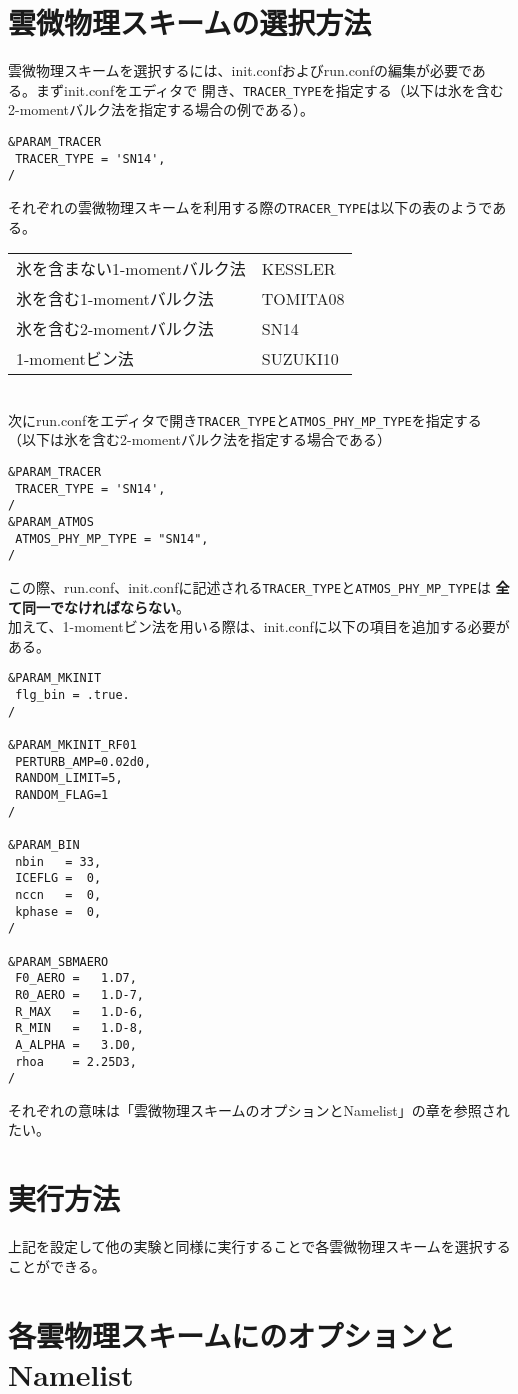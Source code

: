 \section{雲微物理スキームの選択方法}
雲微物理スキームを選択するには、init.confおよびrun.confの編集が必要である。まずinit.confをエディタで
開き、\verb|TRACER_TYPE|を指定する（以下は氷を含む2-momentバルク法を指定する場合の例である）。

\begin{verbatim}
&PARAM_TRACER
 TRACER_TYPE = 'SN14',
/
\end{verbatim}

それぞれの雲微物理スキームを利用する際の\verb|TRACER_TYPE|は以下の表のようである。\\


\begin{tabular}{ll}
\hline
氷を含まない1-momentバルク法\cite{kessler_1996}    & KESSLER\\             
氷を含む1-momentバルク法\cite{tomita_2008}         & TOMITA08\\
氷を含む2-momentバルク法\cite{sn_2014}             & SN14\\
1-momentビン法\cite{suzuki_etal_2010}              & SUZUKI10\\
\hline
\end{tabular}
\\
次にrun.confをエディタで開き\verb|TRACER_TYPE|と\verb|ATMOS_PHY_MP_TYPE|を指定する
（以下は氷を含む2-momentバルク法を指定する場合である）\\

\begin{verbatim}
&PARAM_TRACER
 TRACER_TYPE = 'SN14',
/
&PARAM_ATMOS
 ATMOS_PHY_MP_TYPE = "SN14",
/
\end{verbatim}

この際、run.conf、init.confに記述される\verb|TRACER_TYPE|と\verb|ATMOS_PHY_MP_TYPE|は
{\bf 全て同一でなければならない}。\\
加えて、1-momentビン法を用いる際は、init.confに以下の項目を追加する必要がある。\\

\begin{verbatim}
&PARAM_MKINIT
 flg_bin = .true.
/

&PARAM_MKINIT_RF01
 PERTURB_AMP=0.02d0,
 RANDOM_LIMIT=5,
 RANDOM_FLAG=1
/

&PARAM_BIN
 nbin   = 33,
 ICEFLG =  0,
 nccn   =  0,
 kphase =  0,
/

&PARAM_SBMAERO
 F0_AERO =   1.D7,
 R0_AERO =   1.D-7,
 R_MAX   =   1.D-6,
 R_MIN   =   1.D-8,
 A_ALPHA =   3.D0,
 rhoa    = 2.25D3,
/
\end{verbatim}

それぞれの意味は「雲微物理スキームのオプションとNamelist」の章を参照されたい。

\section{実行方法}
上記を設定して他の実験と同様に実行することで各雲微物理スキームを選択することができる。

\section{各雲物理スキームにのオプションとNamelist}
